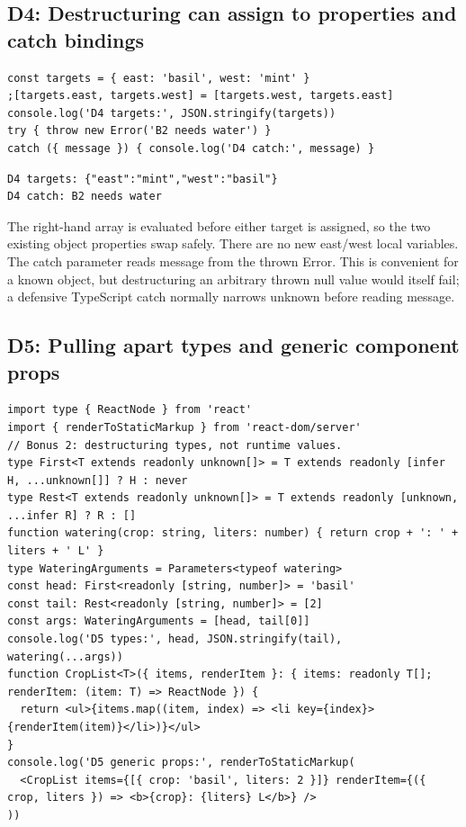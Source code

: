 \documentclass[
  10pt,
  a4paper,
]{article}
\begin{document}
\subsection{D4: Destructuring can assign to properties and catch
bindings}\label{d4-destructuring-can-assign-to-properties-and-catch-bindings}

\begin{lstlisting}
const targets = { east: 'basil', west: 'mint' }
;[targets.east, targets.west] = [targets.west, targets.east]
console.log('D4 targets:', JSON.stringify(targets))
try { throw new Error('B2 needs water') }
catch ({ message }) { console.log('D4 catch:', message) }
\end{lstlisting}

\begin{lstlisting}
D4 targets: {"east":"mint","west":"basil"}
D4 catch: B2 needs water
\end{lstlisting}

The right-hand array is evaluated before either target is assigned, so
the two existing object properties swap safely. There are no new
east/west local variables. The catch parameter reads message from the
thrown Error. This is convenient for a known object, but destructuring
an arbitrary thrown null value would itself fail; a defensive TypeScript
catch normally narrows unknown before reading message.

\subsection{D5: Pulling apart types and generic component
props}\label{d5-pulling-apart-types-and-generic-component-props}

\begin{lstlisting}
import type { ReactNode } from 'react'
import { renderToStaticMarkup } from 'react-dom/server'
// Bonus 2: destructuring types, not runtime values.
type First<T extends readonly unknown[]> = T extends readonly [infer H, ...unknown[]] ? H : never
type Rest<T extends readonly unknown[]> = T extends readonly [unknown, ...infer R] ? R : []
function watering(crop: string, liters: number) { return crop + ': ' + liters + ' L' }
type WateringArguments = Parameters<typeof watering>
const head: First<readonly [string, number]> = 'basil'
const tail: Rest<readonly [string, number]> = [2]
const args: WateringArguments = [head, tail[0]]
console.log('D5 types:', head, JSON.stringify(tail), watering(...args))
function CropList<T>({ items, renderItem }: { items: readonly T[]; renderItem: (item: T) => ReactNode }) {
  return <ul>{items.map((item, index) => <li key={index}>{renderItem(item)}</li>)}</ul>
}
console.log('D5 generic props:', renderToStaticMarkup(
  <CropList items={[{ crop: 'basil', liters: 2 }]} renderItem={({ crop, liters }) => <b>{crop}: {liters} L</b>} />
))
\end{lstlisting}
\end{document}
